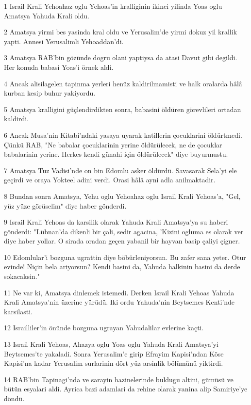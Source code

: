 \par 1 Israil Krali Yehoahaz oglu Yehoas'in kralliginin ikinci yilinda Yoas oglu Amatsya Yahuda Krali oldu.
\par 2 Amatsya yirmi bes yasinda kral oldu ve Yerusalim'de yirmi dokuz yil krallik yapti. Annesi Yerusalimli Yehoaddan'di.
\par 3 Amatsya RAB'bin gözünde dogru olani yaptiysa da atasi Davut gibi degildi. Her konuda babasi Yoas'i örnek aldi.
\par 4 Ancak alisilagelen tapinma yerleri henüz kaldirilmamisti ve halk oralarda hâlâ kurban kesip buhur yakiyordu.
\par 5 Amatsya kralligini güçlendirdikten sonra, babasini öldüren görevlileri ortadan kaldirdi.
\par 6 Ancak Musa'nin Kitabi'ndaki yasaya uyarak katillerin çocuklarini öldürtmedi. Çünkü RAB, "Ne babalar çocuklarinin yerine öldürülecek, ne de çocuklar babalarinin yerine. Herkes kendi günahi için öldürülecek" diye buyurmustu.
\par 7 Amatsya Tuz Vadisi'nde on bin Edomlu asker öldürdü. Savasarak Sela'yi ele geçirdi ve oraya Yokteel adini verdi. Orasi hâlâ ayni adla anilmaktadir.
\par 8 Bundan sonra Amatsya, Yehu oglu Yehoahaz oglu Israil Krali Yehoas'a, "Gel, yüz yüze görüselim" diye haber gönderdi.
\par 9 Israil Krali Yehoas da karsilik olarak Yahuda Krali Amatsya'ya su haberi gönderdi: "Lübnan'da dikenli bir çali, sedir agacina, 'Kizini ogluma es olarak ver diye haber yollar. O sirada oradan geçen yabanil bir hayvan basip çaliyi çigner.
\par 10 Edomlular'i bozguna ugrattin diye böbürleniyorsun. Bu zafer sana yeter. Otur evinde! Niçin bela ariyorsun? Kendi basini da, Yahuda halkinin basini da derde sokacaksin."
\par 11 Ne var ki, Amatsya dinlemek istemedi. Derken Israil Krali Yehoas Yahuda Krali Amatsya'nin üzerine yürüdü. Iki ordu Yahuda'nin Beytsemes Kenti'nde karsilasti.
\par 12 Israilliler'in önünde bozguna ugrayan Yahudalilar evlerine kaçti.
\par 13 Israil Krali Yehoas, Ahazya oglu Yoas oglu Yahuda Krali Amatsya'yi Beytsemes'te yakaladi. Sonra Yerusalim'e girip Efrayim Kapisi'ndan Köse Kapisi'na kadar Yerusalim surlarinin dört yüz arsinlik bölümünü yiktirdi.
\par 14 RAB'bin Tapinagi'nda ve sarayin hazinelerinde buldugu altini, gümüsü ve bütün esyalari aldi. Ayrica bazi adamlari da rehine olarak yanina alip Samiriye'ye döndü.
